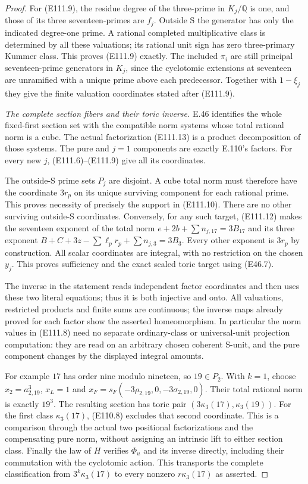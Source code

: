 \begin{proof}
For (E111.9), the residue degree of the three-prime
in $K_j/\mathbb Q$ is one, and those of its three
seventeen-primes are $f_j$. Outside S the generator
has only the indicated degree-one prime. A rational
completed multiplicative class is determined by all
these valuations; its rational unit sign has zero
three-primary Kummer class. This proves (E111.9)
exactly. The included $\pi_i$ are still principal
seventeen-prime generators in $K_j$, since the
cyclotomic extensions at seventeen are unramified
with a unique prime above each predecessor.
Together with $1-\xi_j$ they give the finite valuation
coordinates stated after (E111.9).

\emph{The complete section fibers and their toric inverse.}
E.46 identifies the whole fixed-first section set with
the compatible norm systems whose total rational norm
is a cube. The actual factorization (E111.13) is a
product decomposition of those systems. The pure and
$j=1$ components are exactly E.110's factors. For every
new $j$, (E111.6)--(E111.9) give all its coordinates.

The outside-S prime sets $P_j$ are disjoint. A cube
total norm must therefore have the coordinate $3r_p$
on its unique surviving component for each rational
prime. This proves necessity of precisely the support
in (E111.10). There are no other surviving outside-S
coordinates. Conversely, for any such target, (E111.12)
makes the seventeen exponent of the total norm
$e+2b+\sum n_{j,17}=3B_{17}$ and its three exponent
$B+C+3z-\sum\ell_pr_p+\sum n_{j,3}=3B_3$.
Every other exponent is $3r_p$ by construction.
All scalar coordinates are integral, with no
restriction on the chosen $y_j$. This proves sufficiency
and the exact scaled toric target using (E46.7).

The inverse in the statement reads independent factor
coordinates and then uses these two literal equations;
thus it is both injective and onto. All valuations,
restricted products and finite sums are continuous;
the inverse maps already proved for each factor show
the asserted homeomorphism. In particular the norm
values in (E111.8) need no separate ordinary-class or
universal-unit projection computation: they are read
on an arbitrary chosen coherent S-unit, and the pure
component changes by the displayed integral amounts.

For example $17$ has order nine modulo nineteen,
so $19\in P_2$. With $k=1$, choose $x_2=a_{2,19}^3$,
$x_L=1$ and
$x_F=s_F(-3\rho_{2,19},0,-3\sigma_{2,19},0)$.
Their total rational norm is exactly $19^3$.
The resulting section has toric pair
$(3\kappa_3(17),\kappa_3(19))$.
For the first class $\kappa_3(17)$, (E110.8) excludes
that second coordinate. This is a comparison through
the actual two positional factorizations and the
compensating pure norm, without assigning an
intrinsic lift to either section class.
Finally the law of $H$ verifies $\Phi_u$ and its inverse
directly, including their commutation with the
cyclotomic action. This transports the complete
classification from $3^k\kappa_3(17)$ to every nonzero
$r\kappa_3(17)$ as asserted.
\end{proof}
